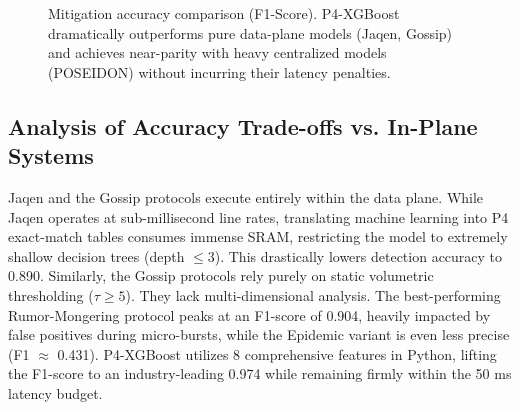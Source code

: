 \documentclass[sigconf, nonacm]{acmart}
\begin{document}
\begin{figure}[htbp]
\centering
{}
\caption{Mitigation accuracy comparison (F1-Score). P4-XGBoost dramatically outperforms pure data-plane models (Jaqen, Gossip) and achieves near-parity with heavy centralized models (POSEIDON) without incurring their latency penalties.}
\label{fig:accuracy_compare}
\end{figure}

\subsection{Analysis of Accuracy Trade-offs vs. In-Plane Systems}
Jaqen and the Gossip protocols execute entirely within the data plane. While Jaqen operates at sub-millisecond line rates, translating machine learning into P4 exact-match tables consumes immense SRAM, restricting the model to extremely shallow decision trees (depth $\le 3$). This drastically lowers detection accuracy to 0.890. Similarly, the Gossip protocols rely purely on static volumetric thresholding ($\tau \ge 5$). They lack multi-dimensional analysis. The best-performing Rumor-Mongering protocol peaks at an F1-score of 0.904, heavily impacted by false positives during micro-bursts, while the Epidemic variant is even less precise (F1 $\approx$ 0.431). P4-XGBoost utilizes 8 comprehensive features in Python, lifting the F1-score to an industry-leading 0.974 while remaining firmly within the 50 ms latency budget.
\end{document}
